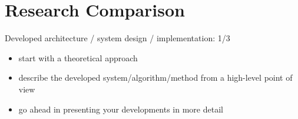 
\chapter{Research Comparison}%
\label{sec:related_work}

Developed architecture / system design / implementation: 1/3

\begin{itemize}
    \item start with a theoretical approach
    \item describe the developed system/algorithm/method from a high-level point of view
    \item go ahead in presenting your developments in more detail
\end{itemize}
